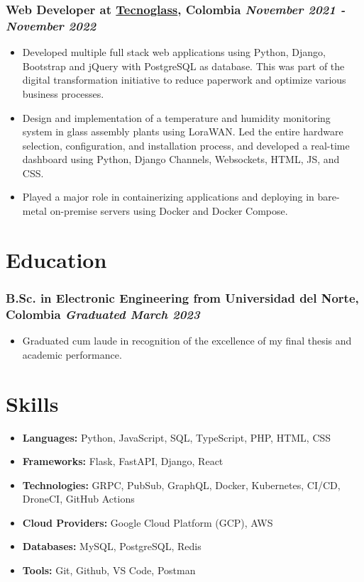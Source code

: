 \documentclass[a4paper,10pt]{article}
\begin{document}
\subsubsection*{%
  \textbf{Web Developer} at \href{https://www.tecnoglass.com/en/}{Tecnoglass}, Colombia
  \hfill
  \textit{November 2021 - November 2022}
}
\begin{itemize}
  \item Developed multiple full stack web applications using Python, Django, Bootstrap and jQuery with PostgreSQL as database.
    This was part of the digital transformation initiative to reduce paperwork and optimize various business processes.
  \item Design and implementation of a temperature and humidity monitoring system in glass assembly plants using LoraWAN.
    Led the entire hardware selection, configuration, and installation process, and developed a real-time
    dashboard using Python, Django Channels, Websockets, HTML, JS, and CSS.
  \item Played a major role in containerizing applications and deploying in bare-metal on-premise servers using Docker and Docker Compose.
\end{itemize}

\section*{Education}
\subsubsection*{\textbf{B.Sc. in Electronic Engineering} from Universidad del Norte, Colombia \hfill \textit{Graduated March 2023}}
\begin{itemize}
  \item Graduated cum laude in recognition of the excellence of my final thesis and academic performance.
\end{itemize}

\section*{Skills}
\begin{itemize}
  \item \textbf{Languages:} Python, JavaScript, SQL, TypeScript, PHP, HTML, CSS
  \item \textbf{Frameworks:} Flask, FastAPI, Django, React
  \item \textbf{Technologies:} GRPC, PubSub, GraphQL, Docker, Kubernetes, CI/CD, DroneCI, GitHub Actions
  \item \textbf{Cloud Providers:} Google Cloud Platform (GCP), AWS
  \item \textbf{Databases:} MySQL, PostgreSQL, Redis
  \item \textbf{Tools:} Git, Github, VS Code, Postman
\end{itemize}

\end{document}
